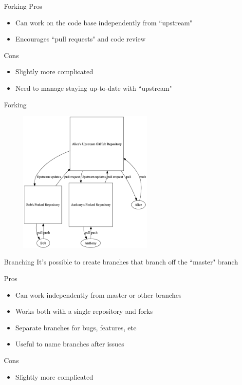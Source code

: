 \documentclass{beamer}
\begin{document}
    \begin{frame}{Forking}
        Pros
        \begin{itemize}
            \item Can work on the code base independently from ``upstream"
            \item Encourages ``pull requests" and code review
        \end{itemize}

        Cons
        \begin{itemize}
            \item Slightly more complicated
            \item Need to manage staying up-to-date with ``upstream"
        \end{itemize}
    \end{frame}

    \begin{frame}{Forking}
        \begin{figure}
            \centering
            \includegraphics[width=0.6\textwidth]{figures/fork.png}
        \end{figure}
    \end{frame}

    \begin{frame}{Branching}
        It's possible to create branches that branch off the ``master" branch

        Pros
        \begin{itemize}
            \item Can work independently from master or other branches
            \item Works both with a single repository and forks
            \item Separate branches for bugs, features, etc
            \item Useful to name branches after issues
        \end{itemize}

        Cons
        \begin{itemize}
            \item Slightly more complicated
        \end{itemize}
    \end{frame}
\end{document}
